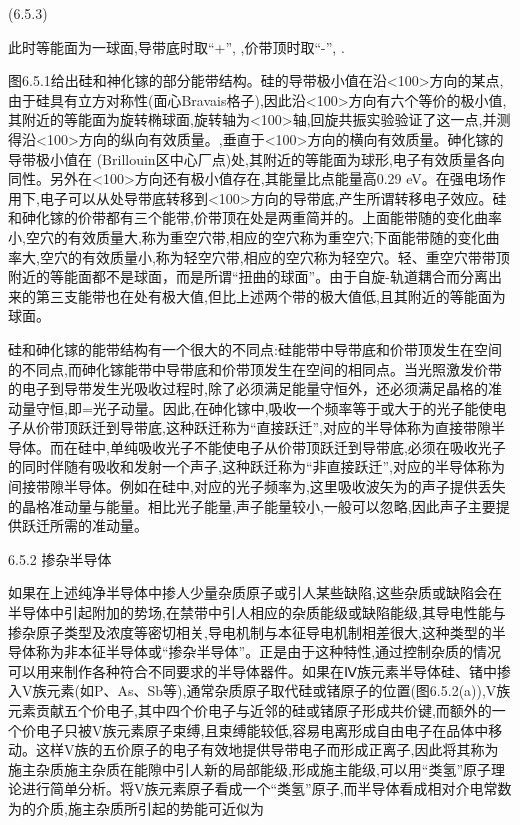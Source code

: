  	(6.5.3)

此时等能面为一球面,导带底时取“+”, ,价带顶时取“-”, .

图6.5.1给出硅和神化镓的部分能带结构。硅的导带极小值在沿<100>方向的某点,由于硅具有立方对称性(面心Bravais格子),因此沿<100>方向有六个等价的极小值,其附近的等能面为旋转椭球面,旋转轴为<100>轴,回旋共振实验验证了这一点,并测得沿<100>方向的纵向有效质量。,垂直于<100>方向的横向有效质量。砷化镓的导带极小值在 (Brillouin区中心厂点)处,其附近的等能面为球形,电子有效质量各向同性。另外在<100>方向还有极小值存在,其能量比点能量高0.29 eV。在强电场作用下,电子可以从处导带底转移到<100>方向的导带底,产生所谓转移电子效应。硅和砷化镓的价带都有三个能带,价带顶在处是两重简并的。上面能带随的变化曲率小,空穴的有效质量大,称为重空穴带,相应的空穴称为重空穴;下面能带随的变化曲率大,空穴的有效质量小,称为轻空穴带,相应的空穴称为轻空穴。轻、重空穴带带顶附近的等能面都不是球面，而是所谓“扭曲的球面”。由于自旋-轨道耦合而分离出来的第三支能带也在处有极大值,但比上述两个带的极大值低,且其附近的等能面为球面。

硅和砷化镓的能带结构有一个很大的不同点:硅能带中导带底和价带顶发生在空间的不同点,而砷化镓能带中导带底和价带顶发生在空间的相同点。当光照激发价带的电子到导带发生光吸收过程时,除了必须满足能量守恒外，还必须满足晶格的准动量守恒,即=光子动量。因此,在砷化镓中,吸收一个频率等于或大于的光子能使电子从价带顶跃迁到导带底,这种跃迁称为“直接跃迁”,对应的半导体称为直接带隙半导体。而在硅中,单纯吸收光子不能使电子从价带顶跃迁到导带底,必须在吸收光子的同时伴随有吸收和发射一个声子,这种跃迁称为“非直接跃迁”,对应的半导体称为间接带隙半导体。例如在硅中,对应的光子频率为,这里吸收波矢为的声子提供丢失的晶格准动量与能量。相比光子能量,声子能量较小,一般可以忽略,因此声子主要提供跃迁所需的准动量。



6.5.2 掺杂半导体

如果在上述纯净半导体中掺人少量杂质原子或引人某些缺陷,这些杂质或缺陷会在半导体中引起附加的势场,在禁带中引人相应的杂质能级或缺陷能级,其导电性能与掺杂原子类型及浓度等密切相关,导电机制与本征导电机制相差很大,这种类型的半导体称为非本征半导体或“掺杂半导体”。正是由于这种特性,通过控制杂质的情况可以用来制作各种符合不同要求的半导体器件。如果在Ⅳ族元素半导体硅、锗中掺入V族元素(如P、As、Sb等),通常杂质原子取代硅或锗原子的位置(图6.5.2(a)),V族元素贡献五个价电子,其中四个价电子与近邻的硅或锗原子形成共价键,而额外的一个价电子只被V族元素原子束缚,且束缚能较低,容易电离形成自由电子在品体中移动。这样V族的五价原子的电子有效地提供导带电子而形成正离子,因此将其称为施主杂质施主杂质在能隙中引人新的局部能级,形成施主能级,可以用“类氢”原子理论进行简单分析。将V族元素原子看成一个“类氢”原子,而半导体看成相对介电常数为的介质,施主杂质所引起的势能可近似为


